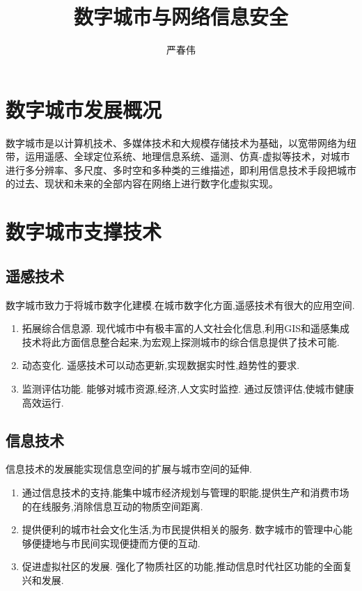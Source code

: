 \documentclass[a4paper]{ctexart}
\author{严春伟}
\title{数字城市与网络信息安全}
\begin{document}
    \maketitle

    \section{数字城市发展概况}
    \par 数字城市是以计算机技术、多媒体技术和大规模存储技术为基础，以宽带网络为纽带，运用遥感、全球定位系统、地理信息系统、遥测、仿真-虚拟等技术，对城市进行多分辨率、多尺度、多时空和多种类的三维描述，即利用信息技术手段把城市的过去、现状和未来的全部内容在网络上进行数字化虚拟实现。 \cite{china-digital-city}

    \section{数字城市支撑技术}
    \subsection{遥感技术}
    \par 数字城市致力于将城市数字化建模.在城市数字化方面,遥感技术有很大的应用空间.
    \begin{enumerate}
        \item 拓展综合信息源. 现代城市中有极丰富的人文社会化信息,利用GIS和遥感集成技术将此方面信息整合起来,为宏观上探测城市的综合信息提供了技术可能.
        \item 动态变化. 遥感技术可以动态更新,实现数据实时性,趋势性的要求.
        \item 监测评估功能. 能够对城市资源,经济,人文实时监控. 通过反馈评估,使城市健康高效运行.
    \end{enumerate}

    \subsection{信息技术}
    \par 信息技术的发展能实现信息空间的扩展与城市空间的延伸.
    \begin{enumerate}
        \item 通过信息技术的支持,能集中城市经济规划与管理的职能,提供生产和消费市场的在线服务,消除信息互动的物质空间距离.
        \item 提供便利的城市社会文化生活,为市民提供相关的服务. 数字城市的管理中心能够便捷地与市民间实现便捷而方便的互动.
        \item 促进虚拟社区的发展. 强化了物质社区的功能,推动信息时代社区功能的全面复兴和发展.
    \end{enumerate}
\end{document}
